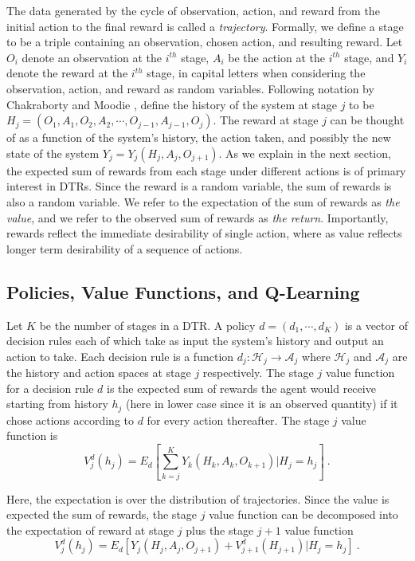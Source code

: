 The data generated by the cycle of observation, action, and reward from the initial action to the final reward is called a \textit{trajectory}. Formally, we define a stage to be a triple containing an observation, chosen action, and resulting reward. Let $O_i$ denote an observation at the $i^{th}$ stage, $ A_i $ be the action at the $ i^{th} $ stage, and $ Y_i $ denote the reward at the $ i^{th}$ stage,  in capital letters when considering the observation, action, and reward as random variables. Following notation by Chakraborty and Moodie \cite{chakraborty2013statistical},  define the history of the system at stage $j$ to be $ H_j = (O_1, A_1, O_2, A_2, \cdots , O_{j-1}, A_{j-1}, O_j) $.  The reward at stage $j$ can be thought of as a function of the system’s history, the action taken, and possibly the new state of the system $ Y_j = Y_j(H_j, A_j, O_{j+1}) $.  As we explain in the next section, the expected sum of rewards from each stage under different actions is of primary interest in DTRs.  Since the reward is a random variable, the sum of rewards is also a random variable.  We refer to the expectation of the sum of rewards as \textit{the value}, and we refer to the observed sum of rewards as \textit{the return}. Importantly, rewards reflect the immediate desirability of single action, where as value reflects longer term desirability of a sequence of actions.

\subsection{Policies, Value Functions, and Q-Learning}

Let $K$ be the number of stages in a DTR.  A policy $ d = (d_1, \cdots, d_K) $ is a vector of decision rules each of which take as input the system’s history and output an action to take.  Each decision rule is a function $d_j : \mathcal{H}_j \to \mathcal{A}_j$ where $\mathcal{H}_j$ and $\mathcal{A}_j$ are the history and action spaces at stage $j$ respectively.  The stage $ j $ value function for a decision rule $ d $ is the expected sum of rewards the agent would receive starting from history $ h_j  $ (here in lower case since it is an observed quantity) if it chose actions according to $ d $ for every action thereafter.  The stage $j$ value function is 
\begin{equation}
	V^d_j(h_j) = E_d\left[ \sum_{k=j}^K Y_k(H_k, A_k, O_{k+1}) \Bigg\lvert H_j = h_j\right] \>.
\end{equation}

\noindent Here, the expectation is over the distribution of trajectories. Since the value is expected the sum of rewards, the stage $ j $ 
value function can be decomposed into the expectation of reward at stage $ j $ plus the stage $ j+1  $ value function  \cite{chakraborty2013statistical}
\begin{equation}
	V^d_j(h_j) = E_d\left[Y_j(H_j, A_j, O_{j+1}) + V^d_{j+1}(H_{j+1}) \vert H_j = h_j\right] \>.
\end{equation}


